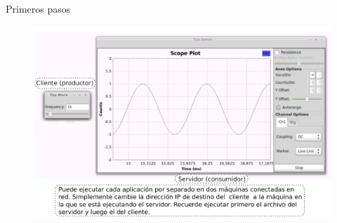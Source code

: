 \begin{frame}{Primeros pasos}
\begin{figure}[H]
\centering
\includegraphics[width=\textwidth, height=0.55\textwidth]{lab1/pdf/lab1_27.pdf}
\end{figure}
\end{frame}


